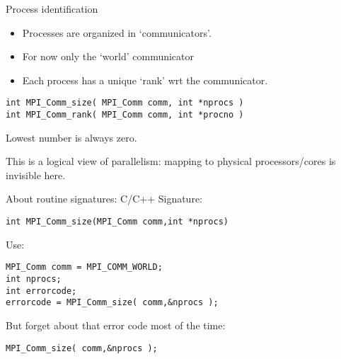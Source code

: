 
\begin{numberedframe}{Process identification}
  \label{sl:comm-world}
  \begin{itemize}
  \item Processes are organized in `communicators'.
  \item For now only the `world' communicator
  \item Each process has a unique `rank' wrt the communicator.
  \end{itemize}

\lstset{language=C}
\begin{lstlisting}
int MPI_Comm_size( MPI_Comm comm, int *nprocs )
int MPI_Comm_rank( MPI_Comm comm, int *procno )
\end{lstlisting}
Lowest number is always zero.

This is a logical view of parallelism: mapping to physical
processors/cores is invisible here.
\end{numberedframe}

\begin{exerciseframe}[commrank]
  
\end{exerciseframe}



\begin{numberedframe}{About routine signatures: C/C++}
  \label{sec:protos}
Signature:
\lstset{language=C}
\begin{lstlisting}
int MPI_Comm_size(MPI_Comm comm,int *nprocs)
\end{lstlisting}
Use:
\lstset{language=C}
\begin{lstlisting}
MPI_Comm comm = MPI_COMM_WORLD;
int nprocs;
int errorcode;
errorcode = MPI_Comm_size( comm,&nprocs );
\end{lstlisting}
But forget about that error code most of the time:
\begin{lstlisting}
MPI_Comm_size( comm,&nprocs );
\end{lstlisting}
\end{numberedframe}

